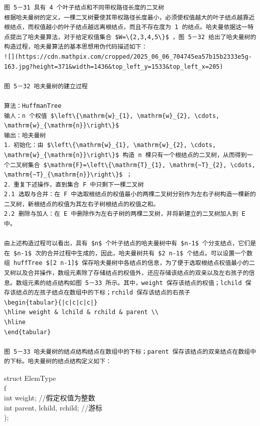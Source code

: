 \documentclass[10pt]{article}
\begin{document}
\begin{verbatim}
图 5－31 具有 4 个叶子结点和不同带权路径长度的二叉树
根据哈夫曼树的定义，一棵二叉树要使其带权路径长度最小，必须使权值越大的叶子结点越靠近根结点，而权值越小的叶子结点越远离根结点，而且不存在度为 1 的结点。哈夫曼依据这一特点提出了哈夫曼算法，对于给定权值集合 $W=\{2,3,4,5\}$ ，图 5－32 给出了哈夫曼树的构造过程，哈夫曼算法的基本思想用伪代码描述如下：
![](https://cdn.mathpix.com/cropped/2025_06_06_704745ea57b15b2333e5g-163.jpg?height=371&width=1436&top_left_y=1533&top_left_x=205)

图 5－32 哈夫曼树的建立过程

算法：HuffmanTree
输人：n 个权值 $\left\{\mathrm{w}_{1}, \mathrm{w}_{2}, \cdots, \mathrm{w}_{\mathrm{n}}\right\}$
输出：哈夫曼树
1．初始化：由 $\left\{\mathrm{w}_{1}, \mathrm{w}_{2}, \cdots, \mathrm{w}_{\mathrm{n}}\right\}$ 构造 n 棵只有一个根结点的二叉树，从而得到一个二叉树集合 $\mathrm{F}=\left\{\mathrm{T}_{1}, \mathrm{~T}_{2}, \cdots, \mathrm{~T}_{\mathrm{n}}\right\}$ ；
2．重复下述操作，直到集合 F 中只剩下一棵二叉树
2.1 选取与合并：在 F 中选取根结点的权值最小的两棵二叉树分别作为左右子树构造一棵新的二叉树，新根结点的权值为其左右子树根结点的权值之和。
2.2 删除与加人：在 E 中删除作为左右子树的两棵二叉树，并将新建立的二叉树加人到 E 中。

由上述构造过程可以看出，具有 $n$ 个叶子结点的哈夫曼树中有 $n-1$ 个分支结点，它们是在 $n-1$ 次的合并过程中生成的，因此，哈夫曼树共有 $2 n-1$ 个结点。可以设置一个数组 huffTree $[2 n-1]$ 保存哈夫曼树中各结点的信息，为了便于选取根结点权值最小的二叉树以及合并操作，数组元素除了存储结点的权值外，还应存储该结点的双亲以及左右孩子的信息。数组元素的结点结构如图 5－33 所示。其中，weight 保存该结点的权值；lchild 保存该结点的左孩子结点在数组中的下标；rchild 保存该结点的右孩子
\begin{tabular}{|c|c|c|c|}
\hline weight & lchild & rchild & parent \\
\hline
\end{tabular}

图 5－33 哈夫曼树的结点结构结点在数组中的下标；parent 保存该结点的双亲结点在数组中的下标。哈夫曼树的结点结构定义如下：
\end{verbatim}

struct ElemType\\
f\\
int weight; //假定权值为整数\\
int parent, lchild, rchild; //游标\\
);
\end{document}
